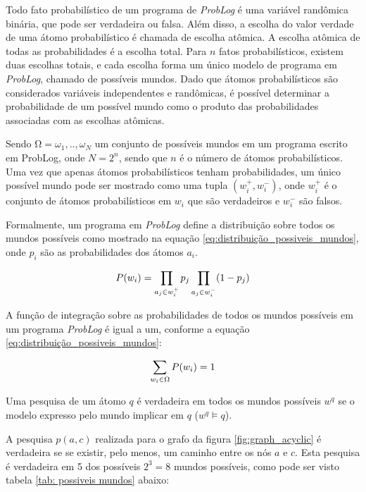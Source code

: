 \documentclass[
	12pt,				%
    oneside,			%
	a4paper,			%
	english,			%
	french,				%
	spanish,			%
	brazil,				%
	]{abntex2}
\begin{document}
Todo fato probabilístico de um programa de \textit{ProbLog} é uma variável randômica binária, que pode ser verdadeira ou falsa. Além disso, a escolha do valor verdade de uma átomo probabilístico é chamada de escolha atômica. A escolha atômica de todas as probabilidades é a escolha total. Para $n$ fatos probabilísticos, existem duas escolhas totais, e cada escolha forma um único modelo de programa em \textit{ProbLog}, chamado de possíveis mundos. Dado que átomos probabilísticos são considerados variáveis independentes e randômicas, é possível determinar a probabilidade de um possível mundo como o produto das probabilidades associadas com as escolhas atômicas. 

Sendo $Ω = {ω_1, .., ω_N }$ um conjunto de possíveis mundos em um programa escrito em ProbLog, onde $N=2^n$, sendo que $n$ é o número de átomos probabilísticos. Uma vez que apenas átomos probabilísticos tenham probabilidades, um  único possível mundo pode ser mostrado como uma tupla $(w_i^+, w_i^-)$, onde $w_i^+$ é o conjunto de átomos probabilísticos em $w_i$ que são verdadeiros e $w_i^-$ são falsos.

Formalmente, um programa em \textit{ProbLog} define a distribuição sobre todos os mundos possíveis como mostrado na equação \ref{eq:distribuição_possiveis_mundos}, onde $p_i$ são as probabilidades dos átomos $a_i$.

\begin{equation}
\centering
    P(w_i)= \prod_{a_j\in w_i^+} p_j \prod_{a_j\in w_i^-} (1-p_j)
    \label{eq:distribuição_possiveis_mundos}
\end{equation}


A função de integração sobre as probabilidades de todos os mundos possíveis em um programa \textit{ProbLog} é igual a um, conforme a equação \ref{eq:distribuição_possiveis_mundos}: 

\begin{equation}
\centering
    \sum_{w_i \in \Omega } {P(w_i)=1}
    \label{eq:distribuição_possiveis_mundos}
\end{equation}

Uma pesquisa de um átomo $q$ é verdadeira em todos os mundos possíveis $w^q$ se o modelo expresso pelo mundo implicar em $q$ ($w^q \models q$).

A pesquisa $p(a, c)$ realizada para o grafo da figura \ref{fig:graph_acyclic} é verdadeira se se existir, pelo menos, um caminho entre os nós $a$ e $c$. Esta pesquisa é verdadeira em 5 dos possíveis $2^3=8$ mundos possíveis, como pode ser visto tabela \ref{tab: possiveis mundos} abaixo:
\end{document}
